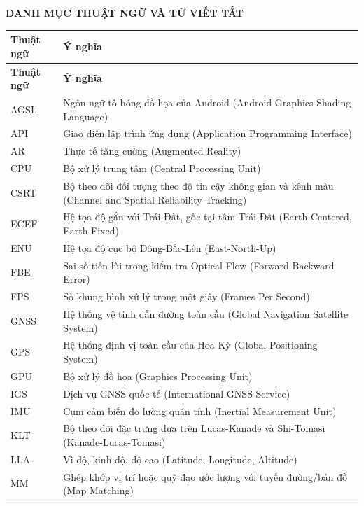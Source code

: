 \documentclass[../DoAn.tex]{subfiles}
\begin{document}
\begin{center}
    \Large{\textbf{DANH MỤC THUẬT NGỮ VÀ TỪ VIẾT TẮT}}\\
\end{center}
\vspace{0.5cm}

\begin{longtable}{|p{2.2cm}|p{11.7cm}|}
\hline
\textbf{Thuật ngữ} & \textbf{Ý nghĩa} \\ \hline
\endfirsthead
\hline
\textbf{Thuật ngữ} & \textbf{Ý nghĩa} \\ \hline
\endhead
AGSL & Ngôn ngữ tô bóng đồ họa của Android (Android Graphics Shading Language) \\ \hline
API & Giao diện lập trình ứng dụng (Application Programming Interface) \\ \hline
AR & Thực tế tăng cường (Augmented Reality) \\ \hline
CPU & Bộ xử lý trung tâm (Central Processing Unit) \\ \hline
CSRT & Bộ theo dõi đối tượng theo độ tin cậy không gian và kênh màu (Channel and Spatial Reliability Tracking) \\ \hline
ECEF & Hệ tọa độ gắn với Trái Đất, gốc tại tâm Trái Đất (Earth-Centered, Earth-Fixed) \\ \hline
ENU & Hệ tọa độ cục bộ Đông-Bắc-Lên (East-North-Up) \\ \hline
FBE & Sai số tiến-lùi trong kiểm tra Optical Flow (Forward-Backward Error) \\ \hline
FPS & Số khung hình xử lý trong một giây (Frames Per Second) \\ \hline
GNSS & Hệ thống vệ tinh dẫn đường toàn cầu (Global Navigation Satellite System) \\ \hline
GPS & Hệ thống định vị toàn cầu của Hoa Kỳ (Global Positioning System) \\ \hline
GPU & Bộ xử lý đồ họa (Graphics Processing Unit) \\ \hline
IGS & Dịch vụ GNSS quốc tế (International GNSS Service) \\ \hline
IMU & Cụm cảm biến đo lường quán tính (Inertial Measurement Unit) \\ \hline
KLT & Bộ theo dõi đặc trưng dựa trên Lucas-Kanade và Shi-Tomasi (Kanade-Lucas-Tomasi) \\ \hline
LLA & Vĩ độ, kinh độ, độ cao (Latitude, Longitude, Altitude) \\ \hline
MM & Ghép khớp vị trí hoặc quỹ đạo ước lượng với tuyến đường/bản đồ (Map Matching) \\ \hline

\end{longtable}
\end{document}
